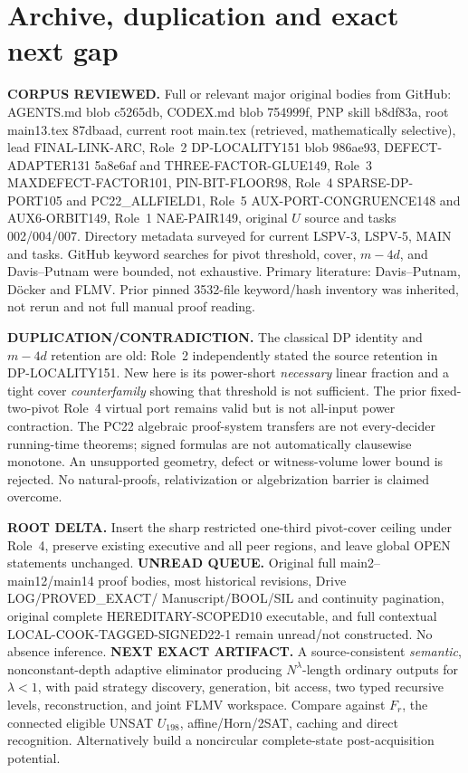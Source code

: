 \documentclass[11pt]{article}
\begin{document}
\section{Archive, duplication and exact next gap}
\noindent\textbf{CORPUS REVIEWED.}
Full or relevant major original bodies from GitHub:
AGENTS.md blob c5265db, CODEX.md blob 754999f,
PNP skill b8df83a, root main13.tex 87dbaad,
current root main.tex (retrieved, mathematically selective),
lead FINAL-LINK-ARC, Role~2 DP-LOCALITY151 blob 986ae93,
DEFECT-ADAPTER131 5a8e6af and THREE-FACTOR-GLUE149,
Role~3 MAXDEFECT-FACTOR101, PIN-BIT-FLOOR98,
Role~4 SPARSE-DP-PORT105 and PC22\_ALLFIELD1,
Role~5 AUX-PORT-CONGRUENCE148 and AUX6-ORBIT149,
Role~1 NAE-PAIR149, original $U$ source and tasks
002/004/007. Directory metadata surveyed for current
LSPV-3, LSPV-5, MAIN and tasks. GitHub keyword searches
for pivot threshold, cover, $m-4d$, and Davis--Putnam were
bounded, not exhaustive. Primary literature: Davis--Putnam,
D\"ocker and FLMV. Prior pinned 3532-file keyword/hash
inventory was inherited, not rerun and not full manual proof
reading.

\noindent\textbf{DUPLICATION/CONTRADICTION.}
The classical DP identity and $m-4d$ retention are old:
Role~2 independently stated the source retention in
DP-LOCALITY151. New here is its power-short \emph{necessary}
linear fraction and a tight cover \emph{counterfamily}
showing that threshold is not sufficient.
The prior fixed-two-pivot Role~4 virtual port remains
valid but is not all-input power contraction.
The PC22 algebraic proof-system transfers are
not every-decider running-time theorems;
signed formulas are not automatically clausewise monotone.
An unsupported geometry, defect or witness-volume
lower bound is rejected. No natural-proofs, relativization
or algebrization barrier is claimed overcome.

\noindent\textbf{ROOT DELTA.}
Insert the sharp restricted one-third pivot-cover ceiling
under Role~4, preserve existing executive and all peer
regions, and leave global OPEN statements unchanged.
\noindent\textbf{UNREAD QUEUE.}
Original full main2--main12/main14 proof bodies, most
historical revisions, Drive LOG/PROVED\_EXACT/
Manuscript/BOOL/SIL and continuity pagination,
original complete HEREDITARY-SCOPED10 executable,
and full contextual LOCAL-COOK-TAGGED-SIGNED22-1
remain unread/not constructed. No absence inference.
\noindent\textbf{NEXT EXACT ARTIFACT.}
A source-consistent \emph{semantic}, nonconstant-depth
adaptive eliminator producing $N^\lambda$-length
ordinary outputs for $\lambda<1$, with paid strategy
discovery, generation, bit access, two typed recursive
levels, reconstruction, and joint FLMV workspace.
Compare against $F_r$, the connected eligible UNSAT
$U_{198}$, affine/Horn/2SAT, caching and direct
recognition. Alternatively build a noncircular
complete-state post-acquisition potential.
\end{document}
